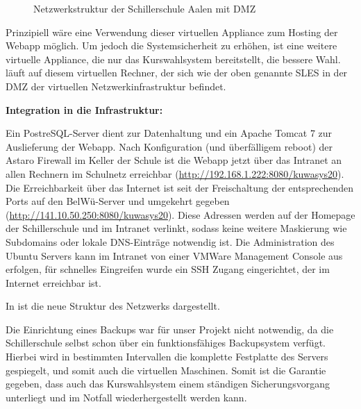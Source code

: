 \begin{figure}[H]
\begin{center}
\end{center}
\caption[\textbf{Netzwerkstruktur der Schillerschule Aalen}]{Netzwerkstruktur der Schillerschule Aalen mit DMZ}
\label{fig:Netzwerkstruktur}
\end{figure}

Prinzipiell wäre eine Verwendung dieser virtuellen \gls{Appliance} zum Hosting der \ac{Webapp} möglich. Um jedoch die Systemsicherheit zu erhöhen, ist eine weitere virtuelle Appliance, die nur das Kurswahlsystem bereitstellt, die bessere Wahl.
 läuft auf diesem virtuellen Rechner, der sich wie der oben genannte SLES in der \gls{DMZ} der virtuellen Netzwerkinfrastruktur befindet.

\textbf{Integration in die Infrastruktur:}

Ein PostreSQL-Server dient zur Datenhaltung und ein Apache Tomcat 7 zur Auslieferung der \ac{Webapp}. Nach Konfiguration (und überfälligem reboot) der Astaro Firewall im Keller der Schule ist die Webapp jetzt über das Intranet an allen Rechnern im Schulnetz erreichbar (\url{http://192.168.1.222:8080/kuwasys20}). Die Erreichbarkeit über das Internet ist seit der Freischaltung der entsprechenden Ports auf den BelWü-Server und umgekehrt gegeben (\url{http://141.10.50.250:8080/kuwasys20}).
Diese Adressen werden auf der Homepage der Schillerschule und im Intranet verlinkt, sodass keine weitere Maskierung wie Subdomains oder lokale DNS-Einträge notwendig ist.
Die Administration des Ubuntu Servers kann im Intranet von einer VMWare Management Console aus erfolgen, für schnelles Eingreifen wurde ein SSH Zugang eingerichtet, der im Internet erreichbar ist.

In  ist die neue Struktur des Netzwerks dargestellt.

Die Einrichtung eines Backups war für unser Projekt nicht notwendig, da die Schillerschule selbst schon über ein funktionsfähiges Backupsystem verfügt. Hierbei wird in bestimmten Intervallen die komplette Festplatte des Servers gespiegelt, und somit auch die virtuellen Maschinen.
Somit ist die Garantie gegeben, dass auch das Kurswahlsystem einem ständigen Sicherungsvorgang unterliegt und im Notfall wiederhergestellt werden kann.
